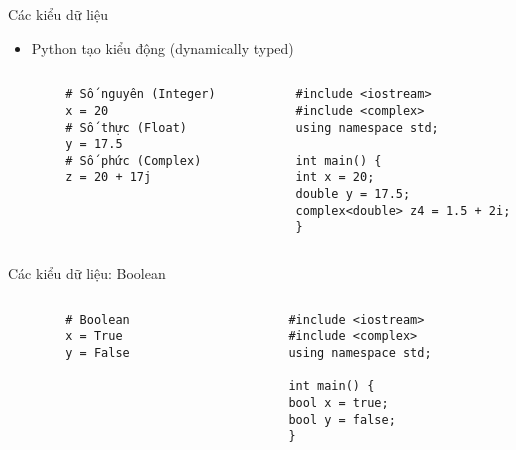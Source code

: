\documentclass[10pt]{beamer}
\begin{document}
\begin{frame}[fragile]{Các kiểu dữ liệu}
  \begin{itemize}
    \item Python tạo kiểu động (dynamically typed)
  \end{itemize}
  \begin{columns}
    \begin{column}{0.4\textwidth}
      \begin{verbatim}
        # Số nguyên (Integer)
        x = 20
        # Số thực (Float)
        y = 17.5
        # Số phức (Complex)
        z = 20 + 17j
      \end{verbatim}
    \end{column}
    \begin{column}{0.7\textwidth}
      \begin{verbatim}
        #include <iostream>
        #include <complex>
        using namespace std;

        int main() {
        int x = 20;
        double y = 17.5;
        complex<double> z4 = 1.5 + 2i;
        }
      \end{verbatim}
    \end{column}
  \end{columns}
\end{frame}

\begin{frame}[fragile]{Các kiểu dữ liệu: Boolean}
  \begin{columns}
    \begin{column}{0.4\textwidth}
      \begin{verbatim}
        # Boolean
        x = True
        y = False
      \end{verbatim}
    \end{column}
    \begin{column}{0.7\textwidth}
      \begin{verbatim}
        #include <iostream>
        #include <complex>
        using namespace std;

        int main() {
        bool x = true;
        bool y = false;
        }
      \end{verbatim}
    \end{column}
  \end{columns}
\end{frame}
\end{document}

